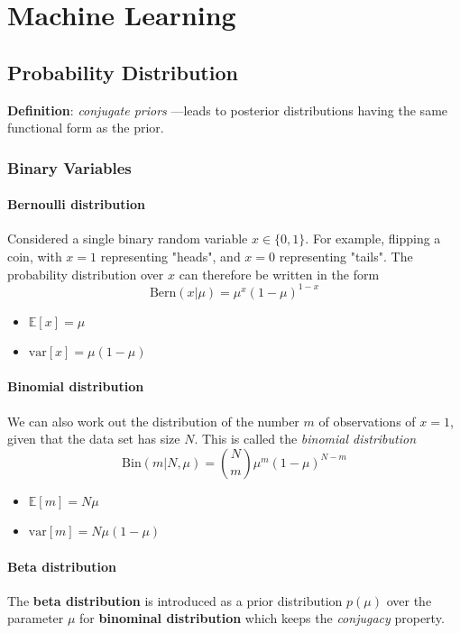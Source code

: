 \documentclass[a3paper, 12pt]{book} %
\begin{document}
\part{Machine Learning}
\chapter{Probability Distribution}
\textbf{Definition}: \emph{conjugate priors} ---leads to posterior distributions having the same functional form as the prior.
\section{Binary Variables}
\subsection{Bernoulli distribution}
Considered a single binary random variable $x \in \{0, 1\}$. For example, flipping a coin, with $x = 1$ representing "heads", and $x = 0$ representing "tails". The probability distribution over $x$ can therefore be written in the form 
\begin{equation}
\mathrm{Bern}(x|\mu) = \mu^{x}(1-\mu)^{1-x}
\end{equation}
\begin{itemize}
	\item $\mathbb{E}[x]=\mu$
	\item $\mathrm{var}[x]=\mu(1-\mu)$
\end{itemize}
\subsection{Binomial distribution}
We can also work out the distribution of the number $m$ of observations of $x = 1$, given that the data set has size $N$. This is called the \emph{binomial distribution}
\begin{equation}
\mathrm{Bin}{(m|N,\mu)}=\binom{N}{m} \mu^m(1-\mu)^{N-m}
\end{equation}
\begin{itemize}
	\item $\mathbb{E}[m]=N\mu$
	\item $\mathrm{var}[m]=N\mu(1-\mu)$
\end{itemize}


\subsection{Beta distribution}
The \textbf{beta distribution} is introduced as a prior distribution $p(\mu)$ over the parameter $\mu$ for \textbf{binominal distribution} which keeps the \emph{conjugacy} property.
\end{document}

